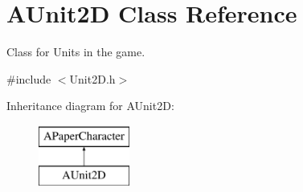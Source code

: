 \hypertarget{class_a_unit2_d}{}\section{A\+Unit2D Class Reference}
\label{class_a_unit2_d}


Class for Units in the game.  




{\ttfamily \#include $<$Unit2\+D.\+h$>$}

Inheritance diagram for A\+Unit2D\+:\begin{figure}[H]
\begin{center}
\leavevmode
\includegraphics[height=2.000000cm]{class_a_unit2_d}
\end{center}
\end{figure}
